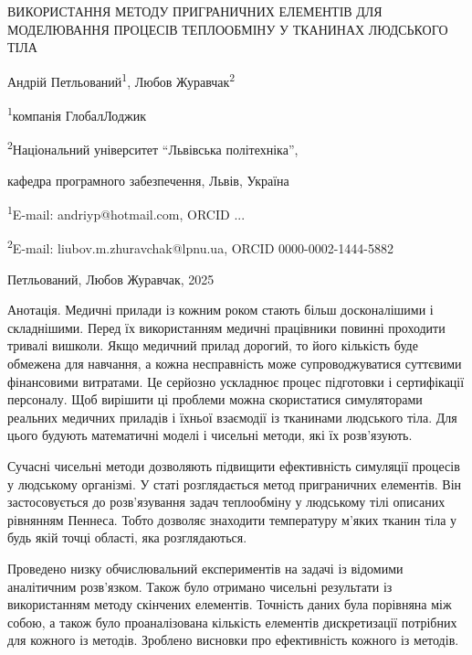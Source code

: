 \documentclass[a4paper,14pt]{extreport}
\begin{document}


\frontmatter

\thispagestyle{empty}


\begin{center}
  ВИКОРИСТАННЯ МЕТОДУ ПРИГРАНИЧНИХ ЕЛЕМЕНТІВ ДЛЯ МОДЕЛЮВАННЯ ПРОЦЕСІВ ТЕПЛООБМІНУ У ТКАНИНАХ ЛЮДСЬКОГО ТІЛА
\end{center}

\begin{center}
Андрій Петльований\textsuperscript{1}, Любов Журавчак\textsuperscript{2}

\textsuperscript{1}компанія ГлобалЛоджик

\textsuperscript{2}Національний університет “Львівська політехніка”,

кафедра програмного забезпечення, Львів, Україна

\textsuperscript{1}E-mail: andriyp@hotmail.com, ORCID ...

\textsuperscript{2}E-mail: liubov.m.zhuravchak@lpnu.ua, ORCID 0000-0002-1444-5882

\end{center}

\noindent{} Петльований, Любов Журавчак, 2025


Анотація. Медичні прилади із кожним роком стають більш досконалішими і складнішими. Перед їх використанням медичні 
працівники повинні проходити тривалі вишколи. Якщо медичний прилад дорогий, то його кількість буде обмежена для 
навчання, а кожна несправність може супроводжуватися суттєвими фінансовими витратами. Це серйозно ускладнює процес 
підготовки і сертифікації персоналу. Щоб вирішити ці проблеми можна скористатися симуляторами реальних медичних приладів
і їхньої взаємодії із тканинами людського тіла. Для цього будують математичні моделі і чисельні методи, які їх 
розв'язують.

Сучасні чисельні методи дозволяють підвищити ефективність симуляції процесів у людському організмі. У статі 
розглядається метод приграничних елементів. Він застосовується до розв'язування задач теплообміну у людському тілі 
описаних рівнянням Пеннеса. Тобто дозволяє знаходити температуру м'яких тканин тіла у будь якій точці області, яка 
розглядаються.

Проведено низку обчислювальний експериментів на задачі із відомими аналітичним розв'язком. Також було отримано чисельні
результати із використанням методу скінчених елементів. Точність даних була порівняна між собою, а також було 
проаналізована кількість елементів дискретизації потрібних для кожного із методів. Зроблено висновки про ефективність 
кожного із методів.
\end{document}
